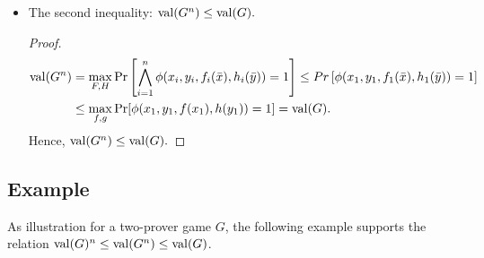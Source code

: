 \begin{itemize}
\begin{proof}
The couple $(f,h)$ is the optimal couple of strategies for the game $G$, this does not means that the couple $(F,H)$  is the optimal couple of the strategies for the parallel repetition $G^n$. Then, the winning probability for $G^n$ over the optimal couple of strategies is:
\begin{align*}
\val (G^n)= & \max\limits_{F,H} \Pr \left[\bigwedge\limits_{i=1}^n \phi (x_i,y_i, f_i(\bar{x}), h_i(\bar{y}))=1 \right] 
 \geq  \Pr \left[\bigwedge\limits_{i=1}^n \phi (x_i,y_i, f_i(\bar{x}), h_i(\bar{y}))=1 \right] \\
 = & \prod\limits_{i=1}^n \Pr \left[ \phi (x_i,y_i, f(\bar{x}), h(\bar{y}))=1 \right]  =  \prod\limits_{i=1}^n \val (G)  =  \val (G)^n .
\end{align*}

Hence, $\val (G^n) \geq \val (G)^n.$
\end{proof}

\item The second inequality: $\mathrm{val} (G^n) \leq \mathrm{val} (G).$
\begin{proof}
 \begin{align*}
 \mathrm{val} (G^n) & = \max\limits_{F,H} \Pr \left[\bigwedge\limits_{i=1}^n \phi (x_i,y_i, f_i(\bar{x}), h_i(\bar{y}))=1 \right] \leq Pr \left[ \phi (x_1,y_1, f_1(\bar{x}), h_1(\bar{y}))=1 \right] \\
 &  \leq \max\limits_{f,g} \Pr[\phi(x_1,y_1,f(x_1),h(y_1))=1]  = \mathrm{val} (G).
 \end{align*}
Hence, $\mathrm{val} (G^n) \leq \mathrm{val} (G).$
\end{proof}
\end{itemize}

\subsection{Example}
As illustration for a two-prover game $G$, the following example supports the relation  $\mathrm{val} (G)^n \leq \mathrm{val} (G^n) \leq \mathrm{val} (G)$.

